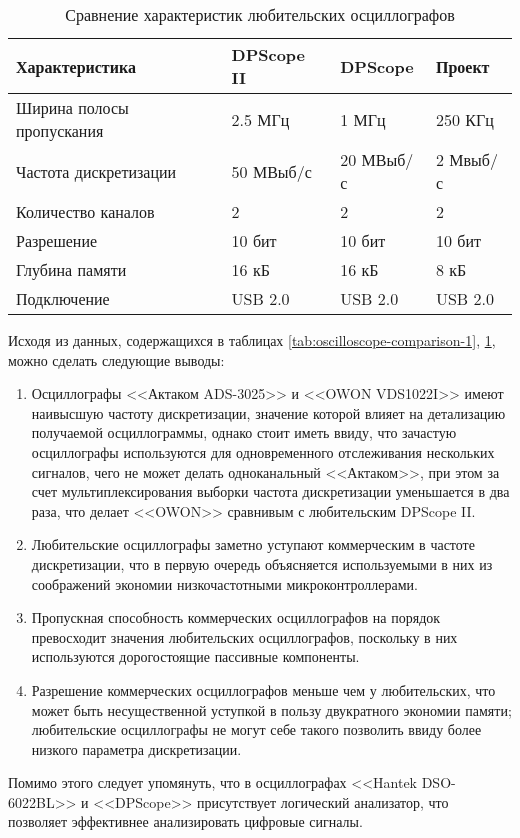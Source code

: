 \begin{table}[H]
    \caption{Сравнение характеристик любительских осциллографов}
    \label{tab:oscilloscope-comparison-2}
    
    \begin{tabularx}{\textwidth}{|l|X|X|X|}
        \hline
        Характеристика & DPScope II & DPScope & Проект \\
        \hline
        Ширина полосы пропускания & 2.5 МГц & 1 МГц & 250 КГц \\
        \hline
        Частота дискретизации & 50 МВыб/с & 20 МВыб/с & 2 Мвыб/с \\
        \hline
        Количество каналов & 2 & 2 & 2 \\
        \hline
        Разрешение & 10 бит & 10 бит & 10 бит \\
        \hline
        Глубина памяти & 16 кБ & 16 кБ & 8 кБ \\
        \hline
        Подключение & USB 2.0 & USB 2.0 & USB 2.0 \\
        \hline
    \end{tabularx}
\end{table}

Исходя из данных, содержащихся в таблицах \ref{tab:oscilloscope-comparison-1}, \ref{tab:oscilloscope-comparison-2}, можно сделать следующие выводы:
\begin{enumerate}

    \item Осциллографы <<Актаком ADS-3025>> и <<OWON VDS1022I>> имеют наивысшую частоту дискретизации, значение которой влияет на детализацию получаемой осциллограммы, однако стоит иметь ввиду, что зачастую осциллографы используются для одновременного отслеживания нескольких сигналов, чего не может делать одноканальный <<Актаком>>, при этом за счет мультиплексирования выборки частота дискретизации уменьшается в два раза, что делает <<OWON>> сравнивым с любительским DPScope II.
    
    \item Любительские осциллографы заметно уступают коммерческим в частоте дискретизации, что в первую очередь объясняется используемыми в них из соображений экономии низкочастотными микроконтроллерами.
    
    \item Пропускная способность коммерческих осциллографов на порядок превосходит значения любительских осциллографов, поскольку в них используются дорогостоящие пассивные компоненты.
    
    \item Разрешение коммерческих осциллографов меньше чем у любительских, что может быть несущественной уступкой в пользу двукратного экономии памяти; любительские осциллографы не могут себе такого позволить ввиду более низкого параметра дискретизации.
\end{enumerate}

Помимо этого следует упомянуть, что в осциллографах <<Hantek DSO-6022BL>> и <<DPScope>> присутствует логический анализатор, что позволяет эффективнее анализировать цифровые сигналы.